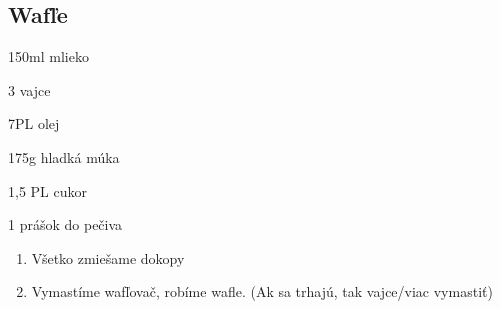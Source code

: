 \setcounter{step}{0}
\subsection{Wafľe}

\begin{ingredient}
\def\portions{3}%

\begin{main}
	\item 150ml mlieko
	\item 3 vajce
	\item 7PL olej
	\item 175g hladká múka
	\item 1,5 PL cukor
	\item 1 prášok do pečiva
\end{main}
\end{ingredient}
\begin{recipe}

\begin{enumerate}


\item{Všetko zmiešame dokopy}
\item{Vymastíme wafľovač, robíme wafle. (Ak sa trhajú, tak vajce/viac vymastiť)}

\end{enumerate}
\end{recipe}

\begin{notes}

\end{notes}
\clearpage	